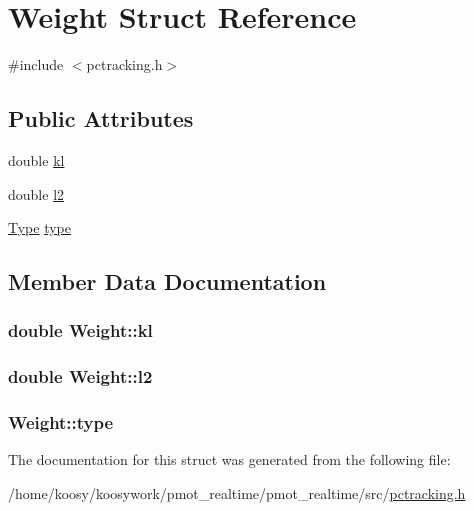 \hypertarget{struct_weight}{\section{\-Weight \-Struct \-Reference}
\label{struct_weight}
}


{\ttfamily \#include $<$pctracking.\-h$>$}

\subsection*{\-Public \-Attributes}
\begin{DoxyCompactItemize}
\item 
double \hyperlink{struct_weight_a7c2e14c0bab862342cfc81c74ff7e198}{kl}
\item 
double \hyperlink{struct_weight_a4b58bfc0b93353e2c3500cee4262ca06}{l2}
\item 
\hyperlink{pctracking_8h_a1d1cfd8ffb84e947f82999c682b666a7}{\-Type} \hyperlink{struct_weight_a46db36734becdda8a6994d8574986f1f}{type}
\end{DoxyCompactItemize}


\subsection{\-Member \-Data \-Documentation}
\hypertarget{struct_weight_a7c2e14c0bab862342cfc81c74ff7e198}{
\subsubsection[{kl}]{\setlength{\rightskip}{0pt plus 5cm}double {\bf \-Weight\-::kl}}}\label{struct_weight_a7c2e14c0bab862342cfc81c74ff7e198}
\hypertarget{struct_weight_a4b58bfc0b93353e2c3500cee4262ca06}{
\subsubsection[{l2}]{\setlength{\rightskip}{0pt plus 5cm}double {\bf \-Weight\-::l2}}}\label{struct_weight_a4b58bfc0b93353e2c3500cee4262ca06}
\hypertarget{struct_weight_a46db36734becdda8a6994d8574986f1f}{
\subsubsection[{type}]{ {\bf \-Weight\-::type}}}\label{struct_weight_a46db36734becdda8a6994d8574986f1f}


\-The documentation for this struct was generated from the following file\-:\begin{DoxyCompactItemize}
\item 
/home/koosy/koosywork/pmot\-\_\-realtime/pmot\-\_\-realtime/src/\hyperlink{pctracking_8h}{pctracking.\-h}\end{DoxyCompactItemize}
